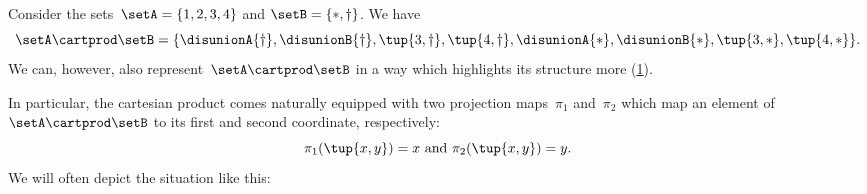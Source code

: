\begin{example}
  Consider the sets~$\setA = \{1, 2, 3, 4\}$ and $\setB = \{ \ast, \dagger \}$.
  We have
  \begin{equation}\label{eq:cart-prod-example}
    \setA \cartprod \setB = \{ \disunionA{\dagger}, \disunionB{ \dagger}, \tup{3, \dagger}, \tup{4, \dagger}, \disunionA{*}, \disunionB{ *}, \tup{3, *}, \tup{4, *} \}.
  \end{equation}
  We can, however, also represent~$\setA \cartprod \setB$ in a way which highlights its structure more (\cref{fig:example_cartesian}).

  \begin{figure}[h!]
    \begin{center}
    \end{center}
    \label{fig:example_cartesian}
  \end{figure}
  In particular, the cartesian product comes naturally equipped with two projection maps~$\pi_1$ and~$\pi_2$ which map an element of~$\setA \cartprod \setB$ to its first and second coordinate, respectively:
  \begin{equation*}
    \pi_1(\tup{x,y}) =  x \text{ and } \pi_2(\tup{x,y}) = y.
  \end{equation*}
We will often depict the situation like this:
\end{example}
  \begin{figure}[h!]
  \begin{center}
  \end{center}
    \label{fig:diagram_cartesian_2}
  \end{figure}



%


